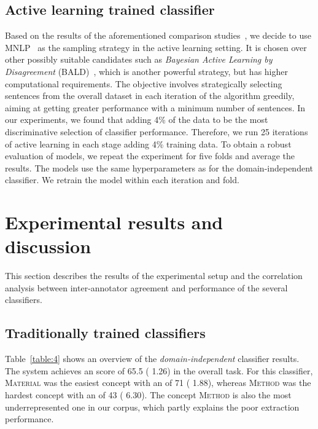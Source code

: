 \documentclass[runningheads]{llncs}
\begin{document}
\subsection{Active learning trained classifier}
Based on the results of the aforementioned comparison studies~\cite{Siddhant2018DeepBA,Zhang2016ActiveDT}, we decide to use MNLP~\cite{Shen2017DeepAL} as the sampling strategy in the active learning setting. It is chosen over other possibly suitable candidates such as \emph{Bayesian Active Learning by Disagreement} (BALD)~\cite{Houlsby2011BayesianAL}, which is another powerful strategy, but has higher computational requirements.
The objective involves strategically selecting sentences from the overall dataset in each iteration of the algorithm greedily, aiming at getting greater performance with a minimum number of sentences. In our experiments, we found that adding 4\% of the data to be the most discriminative selection of classifier performance. Therefore, we run 25 iterations of active learning in each stage adding 4\% training data. To obtain a robust evaluation of models, we repeat the experiment for five folds and average the results. 
The models use the same hyperparameters as for the domain-independent classifier. We retrain the model within each iteration and fold. 

\section{Experimental results and discussion}
This section describes the results of the experimental setup and the correlation analysis between inter-annotator agreement and performance of the several classifiers.

\subsection{Traditionally trained classifiers}
Table~\ref{table:4} shows an overview of the \textit{domain-independent} classifier results. The system achieves an  score of 65.5 ( 1.26) in the overall task. For this classifier, \textsc{Material} was the easiest concept with an  of 71 ( 1.88), whereas \textsc{Method} was the hardest concept with an  of 43 ( 6.30). 
The concept \textsc{Method} is also the most underrepresented one in our corpus, which partly explains the poor extraction performance.
\end{document}
